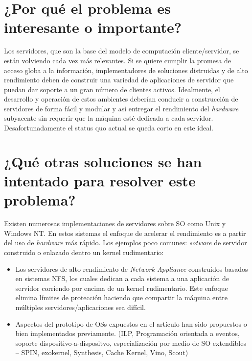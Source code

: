 \section{¿Por qué el problema es interesante o importante?}
Los servidores, que son la base del modelo de computación cliente/servidor, se están volviendo cada vez más relevantes. Si se quiere cumplir la promesa de acceso globa a la información, implementadores de soluciones distruidas y de alto rendimiento deben de construir una variedad de aplicaciones de servidor que puedan dar soporte a un gran número de clientes activos. Idealmente, el desarrollo y operación de estos ambientes deberían conducir a construcción de servidores de forma fácil y modular y así entregar el rendimiento del \textit{hardware} subyacente sin requerir que la máquina esté dedicada a cada servidor. Desafortunadamente el status quo actual se queda corto en este ideal.

\section{¿Qué otras soluciones se han intentado para resolver este problema?}
Existen numerosas implementaciones de servidores sobre SO como Unix y Windows NT. En estos sistemas el enfoque de acelerar el rendimiento es a partir del uso de \textit{hardware} más rápido. Los ejemplos poco comunes: \textit{sotware} de servidor construido o enlazado dentro un kernel rudimentario:
\begin{itemize}
    \item Los servidores de alto rendimiento de \textit{Network Appliance} construidos basados en sistemas NFS, los cuales dedican a cada sistema a una aplicación de servidor corriendo por encima de un kernel rudimentario. Este enfoque elimina límites de protección haciendo que compartir la máquina entre múltiples servidores/aplicaciones sea difícil.
    \item Aspectos del prototipo de OSs expuestos en el artículo han sido propuestos o bien implementados previamente. (ILP, Programación orientada a eventos, soporte dispositivo-a-dispositvo, especialización por medio de SO extendibles -- SPIN, exokernel, Synthesis, Cache Kernel, Vino, Scout)
\end{itemize}

     
